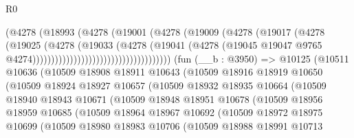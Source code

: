 \begin{lexlean}{R0}
\begin{coremodule}
                                              (@4278
                                                (@18993
                                                  (@4278
                                                    (@19001
                                                      (@4278
                                                        (@19009
                                                          (@4278
                                                            (@19017
                                                              (@4278
                                                                (@19025
                                                                  (@4278
                                                                    (@19033
                                                                      (@4278
                                                                        (@19041
                                                                          (@4278
                                                                            (@19045
                                                                              @19047
                                                                              @9765
                                                                              @4274)))))))))))))))))))))))))))))))))))))
    (fun (__b : @3950) =>
    @10125
      (@10511
        @10636
        (@10509
          @18908
          @18911
          @10643
          (@10509
            @18916
            @18919
            @10650
            (@10509
              @18924
              @18927
              @10657
              (@10509
                @18932
                @18935
                @10664
                (@10509
                  @18940
                  @18943
                  @10671
                  (@10509
                    @18948
                    @18951
                    @10678
                    (@10509
                      @18956
                      @18959
                      @10685
                      (@10509
                        @18964
                        @18967
                        @10692
                        (@10509
                          @18972
                          @18975
                          @10699
                          (@10509
                            @18980
                            @18983
                            @10706
                            (@10509
                              @18988
                              @18991
                              @10713

\end{coremodule}
\end{lexlean}
